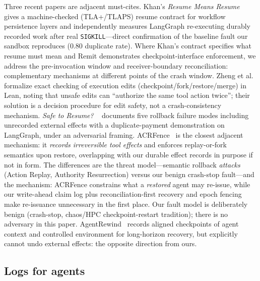 \documentclass[10pt,journal,compsoc]{IEEEtran}
\begin{document}
Three recent papers are adjacent must-cites. Khan's \emph{Resume
Means Resume}~\cite{khan2026resume} gives a machine-checked
(TLA+/TLAPS) resume contract for workflow persistence layers and
independently measures LangGraph re-executing durably recorded
work after real \texttt{SIGKILL}---direct confirmation of the
baseline fault our sandbox reproduces (0.80 duplicate rate). Where
Khan's contract specifies what resume must mean and Remit demonstrates
checkpoint-interface enforcement, we address the pre-invocation window
and receiver-boundary reconciliation: complementary mechanisms at
different points of the crash window. Zheng et
al.~\cite{zheng2026checkpoint} formalize exact checking of
execution edits (checkpoint/fork/restore/merge) in Lean, noting
that unsafe edits can ``authorize the same tool action twice'';
their solution is a decision procedure for edit safety, not a
crash-consistency mechanism. \emph{Safe to Resume?}
~\cite{safutoresume2026} documents five rollback failure modes
including unrecorded external effects with a duplicate-payment
demonstration on LangGraph, under an adversarial framing.
ACRFence~\cite{acrfence2026} is the closest adjacent mechanism:
it \emph{records irreversible tool effects} and enforces
replay-or-fork semantics upon restore, overlapping with our
durable effect records in purpose if not in form. The
differences are the threat model---semantic rollback
\emph{attacks} (Action Replay, Authority Resurrection) versus
our benign crash-stop fault---and the mechanism: ACRFence
constrains what a \emph{restored} agent may re-issue, while our
write-ahead claim log plus reconciliation-first recovery and
epoch fencing make re-issuance unnecessary in the first place.
Our fault model is deliberately benign (crash-stop, chaos/HPC
checkpoint-restart tradition); there is no adversary in this
paper. AgentRewind~\cite{agentrewind2026} records aligned
checkpoints of agent context and controlled environment for
long-horizon recovery, but explicitly cannot undo external
effects: the opposite direction from ours.

\subsection{Logs for agents}
\end{document}
